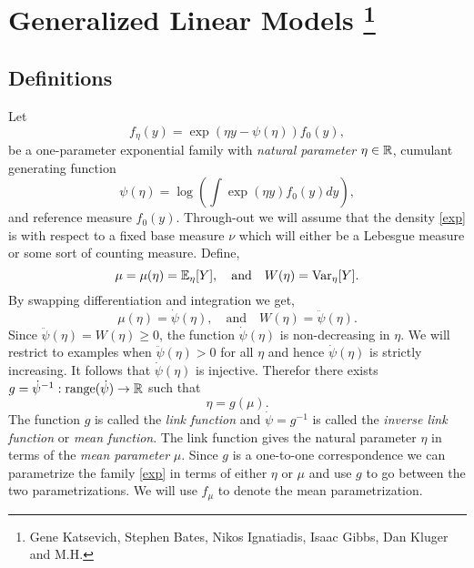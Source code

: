 \section{Generalized Linear Models \footnote{Gene Katsevich, Stephen Bates, Nikos Ignatiadis, Isaac Gibbs, Dan Kluger and M.H.}}

\subsection{Definitions}

Let
\begin{equation}\label{exp}
    f_\eta(y) =  \exp\left(\eta y - \psi(\eta)\right)f_0(y), 
\end{equation}
be a one-parameter exponential family with \emph{natural parameter} $\eta \in \mathbb{R}$, cumulant generating function 
\[
    \psi(\eta) = \log\left(\int \exp(\eta y)f_0(y)dy\right),
\]
and reference measure $f_0(y)$. Through-out we will assume that the density \eqref{exp} is with respect to a fixed base measure $\nu$ which will either be a Lebesgue measure or some sort of counting measure. Define,
\[\mu=\mu(\eta) = {\mathbb E}_\eta[Y], \quad \text{and}\quad  W(\eta) = \mathrm{Var}_\eta[Y]. \]
By swapping differentiation and integration we get,
\[\mu(\eta) = \dot{\psi}(\eta), \quad \text{and}\quad  W(\eta) = \ddot{\psi}(\eta). \]
Since $\ddot{\psi}(\eta) = W(\eta) \ge 0$, the function $\dot{\psi}(\eta)$ is non-decreasing in $\eta$. We will restrict to examples when $\ddot{\psi}(\eta) >0$ for all $\eta$ and hence $\dot{\psi}(\eta)$ is strictly increasing. It follows that $\dot{\psi}(\eta)$ is injective. Therefor there exists $g = \dot{\psi}^{-1} : \mathrm{range}(\dot{\psi}) \to \mathbb{R}$ such that
\[\eta = g(\mu). \]
The function $g$ is called the \emph{link function} and $\dot{\psi} = g^{-1}$ is called the \emph{inverse link function} or \emph{mean function}. The link function gives the natural parameter $\eta$ in terms of the \emph{mean parameter} $\mu$. Since $g$ is a one-to-one correspondence we can parametrize the family \eqref{exp} in terms of either $\eta$ or $\mu$ and use $g$ to go between the two parametrizations. We will use $f_{\mu}$ to denote the mean parametrization.

